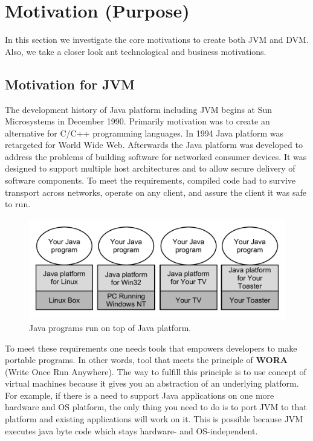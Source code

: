 \documentclass[11pt, oneside]{article}   	%
\begin{document}
\section{Motivation (Purpose)}

In this section we investigate the core motivations to create both JVM and DVM. Also, we take a closer look ant technological and business motivations.

\subsection{Motivation for JVM}

The development history of Java platform including JVM begins at Sun Microsystems in December 1990. Primarily motivation was to create an alternative for C/C++ programming languages. In 1994 Java platform was retargeted for World Wide Web.  Afterwards the Java platform was developed to address the problems of building software for networked consumer devices. It was designed to support multiple host architectures and to allow secure delivery of software components. To meet the requirements, compiled code had to survive transport across networks, operate on any client, and assure the client it was safe to run\cite{lindholm1999java}. 

\begin{figure}
  \center
  \includegraphics[width=\textwidth]{./images/java_platform.pdf}
  \caption{Java programs run on top of Java platform\cite{venners1996inside}.}
  \label{fig:figure2}
\end{figure}

To meet these requirements one needs tools that empowers developers to make portable programs. In other words, tool that meets the principle of \textbf{WORA} (Write Once Run Anywhere). The way to fulfill this principle is to use concept of virtual machines because it gives you an abstraction of an underlying platform. For example, if there is a need to support Java applications on one more hardware and OS platform, the only thing you need to do is to port JVM to that platform and existing applications will work on it. This is possible because JVM executes java byte code which stays hardware- and OS-independent. 
\end{document}

